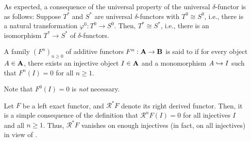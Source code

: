 \documentclass[12pt]{article}
\begin{document}
\begin{rem}
	As expected, a consequence of the universal property of the universal $\delta$-functor is as follows: Suppose $T^{\ast}$ and $S^{\ast}$ are universal $\delta$-functors with $T^{0} \cong S^{0}$, i.e., there is a natural transformation $\varphi^{0} : T^{0} \to S^{0}$. Then, $T^{\ast} \cong S^{\ast}$, i.e., there is an isomorphism $T^{\ast} \to S^{\ast}$ of $\delta$-functors.
\end{rem}

\begin{defn}
	A family $(F^{n})_{n \ge 0}$ of additive functors $F^{n} : \mathbf{A} \to \mathbf{B}$ is said to  if for every object $A \in \mathbf{A}$, there exists an injective object $I \in \mathbf{A}$ and a monomorphism $A \hookrightarrow I$ such that $F^{n}(I) = 0$ for all $n \ge 1$.
\end{defn}
Note that $F^{0}(I) = 0$ is \emph{not} necessary.

\begin{ex}
	Let $F$ be a left exact functor, and $\mathcal{R}^{\ast}F$ denote its right derived functor. Then, it is a simple consequence of the definition that $\mathcal{R}^{n}F(I) = 0$ for all injectives $I$ and all $n \ge 1$. Thus, $\mathcal{R}^{\ast}F$ vanishes on enough injectives (in fact, on all injectives) in view of .
\end{ex}
\end{document}
